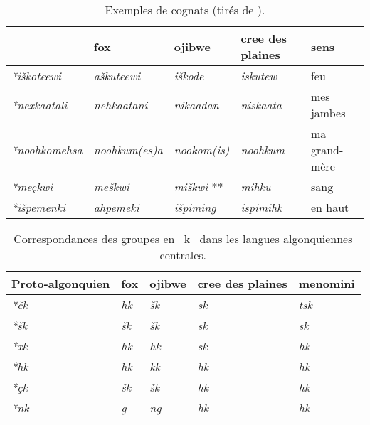 \documentclass[twoside,a4paper,11pt]{article}
\newcommand{\ipa}[1]{{\phon\textit{#1}}}
\newcommand{\Σ}{\greek{Σ}}
\begin{document}
 \begin{table}[h]
 \caption{Exemples de cognats (tirés de \citet{bloomfield25central}).}
 \centering 
\begin{tabular}{lllll}
\toprule
 &fox & ojibwe & cree des plaines&sens \\
\midrule
\ipa{*iškoteewi} & \ipa{aškuteewi} & \ipa{iškode} & \ipa{iskutew} & feu \\
\ipa{*nexkaatali} & \ipa{nehkaatani} & \ipa{nikaadan} & \ipa{niskaata}  &mes jambes \\
\ipa{*noohkomehsa} & \ipa{noohkum(es)a} & \ipa{nookom(is)} & \ipa{noohkum}   &ma grand-mère\\
\ipa{*meçkwi} & \ipa{meškwi} & \ipa{miškwi} **  & \ipa{mihku} &sang\\
\ipa{*išpemenki} & \ipa{ahpemeki} & \ipa{išpiming} & \ipa{ispimihk}   &en haut\\
\bottomrule
\end{tabular}
\end{table}

 
 

\begin{table}[h]
\caption{Correspondances des groupes en --k-- dans les langues algonquiennes centrales.} \centering  \label{tab:clusters.k}
\begin{tabular}{lllll}
\toprule
Proto-algonquien & fox & ojibwe & cree des plaines & menomini \\
\midrule
\ipa{*čk} & \ipa{hk} & \ipa{šk} & \ipa{sk} & \ipa{tsk} \\
\ipa{*šk} & \ipa{šk} & \ipa{šk} & \ipa{sk} & \ipa{sk} \\
\ipa{*xk} & \ipa{hk} & \ipa{hk} & \ipa{sk} & \ipa{hk} \\
\ipa{*hk} & \ipa{hk} & \ipa{kk} & \ipa{hk} & \ipa{hk} \\
\ipa{*çk} & \ipa{šk} & \ipa{šk}    & \ipa{hk} & \ipa{hk} \\
\ipa{*nk} & \ipa{g} & \ipa{ng} & \ipa{hk} & \ipa{hk} \\
\bottomrule
\end{tabular}
\end{table}
 
 
\end{document}
